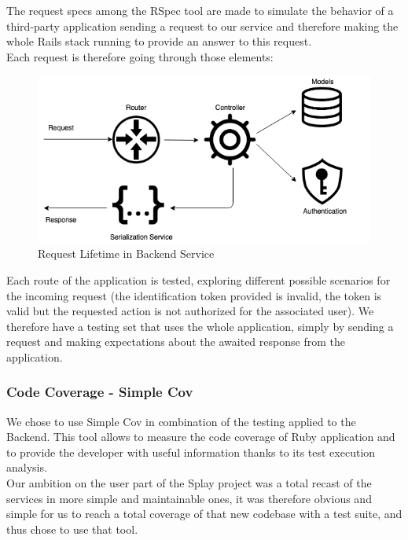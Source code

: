 \documentclass{eplmastersthesis}
\begin{document}
          The request specs among the RSpec tool are made to simulate
          the behavior of a third-party application sending a request to
          our service and therefore making the whole Rails stack running
          to provide an answer to this request.\\
          Each request is therefore going through those elements:\\

          \begin{figure}[H]
            \centering
            \includegraphics[scale=0.6]{figures/request_test.png}
            \caption{\label{request_test} Request Lifetime in Backend Service}
          \end{figure}

          Each route of the application is tested, exploring different possible
          scenarios for the incoming request (the identification token provided
          is invalid, the token is valid but the requested action is not
          authorized for the associated user). We therefore have a testing set
          that uses the whole application, simply by sending a request and
          making expectations about the awaited response from the application.

        \subsubsection{Code Coverage - Simple Cov}

          We chose to use Simple Cov in combination of the testing applied to
          the Backend. This tool allows to measure the code coverage of Ruby
          application and to provide the developer with useful information
          thanks to its test execution analysis.\\

          Our ambition on the user part of the Splay project was a total recast of
          the services in more simple and maintainable ones, it was therefore
          obvious and simple for us to reach a total coverage of that new codebase
          with a test suite, and thus chose to use that tool.\\
\end{document}
